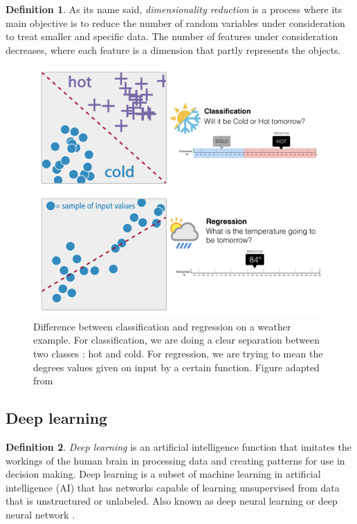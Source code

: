 \documentclass[11pt, openany]{report}
\theoremstyle{plain}
\theoremstyle{definition}
\newtheorem{defn}{Definition}[section]
\theoremstyle{remark}
\begin{document}
\begin{defn}
As its name said, \textit{dimensionality reduction} is a process where its main objective is to reduce the number of random variables under consideration to treat smaller and specific data. The number of features under consideration decreases, where each feature is a dimension that partly represents the objects.
\end{defn}

\begin{figure}[h]
  \centering
  \includegraphics[scale=0.8]{figures/classification-regression.png}
  \caption{Difference between classification and regression on a weather example. For classification, we are doing a clear separation between two classes : hot and cold. For regression, we are trying to mean the degrees values given on input by a certain function. Figure adapted from \cite{fig_class_regression}}
  \label{fig:classification-regression}
\end{figure}

\newpage
\subsection{Deep learning}

\begin{defn}
\textit{Deep learning} is an artificial intelligence function that imitates the workings of the human brain in processing data and creating patterns for use in decision making. Deep learning is a subset of machine learning in artificial intelligence (AI) that has networks capable of learning unsupervised from data that is unstructured or unlabeled. Also known as deep neural learning or deep neural network \cite{DL-1}. 
\end{defn}
\end{document}
